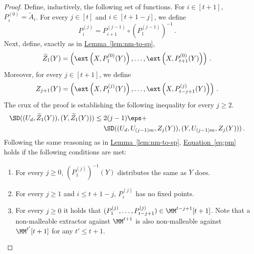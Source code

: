 \documentclass[11pt]{article}
\numberwithin{equation}{section}
\theoremstyle{definition}
\theoremstyle{plain}
\newcommand{\expref}[2]{\hyperref[#2]{#1~\ref{#2}}}
\newcommand{\expeqref}[2]{\hyperref[#2]{#1~\eqref{#2}}}
\begin{document}
\begin{proof}
Define, inductively, the following set of functions. 
For $i \in [t+1]$, $P_i^{(0)} = \widetilde{A}_i$. For every
$j \in [t]$ and $i \in [t+1-j]$, we define
\begin{equation}\label{eq:composing perm}
P_i^{(j)} = P_{i+1}^{(j-1)} \circ \left( P_{1}^{(j-1)} \right)^{-1}\,.
\end{equation}
Next, define, exactly as in \expref{Lemma}{lem:nm-to-sp},
\[
\widetilde{Z}_1(Y) = \left( \ext\left(X,P_{1}^{(0)}(Y)\right),\ldots, \ext\left(X,P_{t+1}^{(0)}(Y)\right) \right)\,.
\]
Moreover, for every $j \in [t+1]$, we define
\[
Z_{j+1}(Y) = \left( \ext\left(X,P_{1}^{(j)}(Y)\right),\ldots, \ext\left(X,P_{t-j+1}^{(j)}(Y)\right)\right)\,.
\]
The crux of the proof is establishing the following inequality for every $j \ge 2$.
\begin{align}\label{eq:pm}
\SD((U_d,\widetilde{Z}_1(Y)),(Y,\widetilde{Z}_1(Y))) &\le 2(j-1)\eps + \nonumber \\
& ~~~~\SD((U_{d},U_{(j-1)m},Z_j(Y)),(Y,U_{(j-1)m},Z_{j}(Y)))\,.
\end{align}
Following the same reasoning as in \expref{Lemma}{lem:nm-to-sp}, \expeqref{Equation}{eq:pm} holds if the 
following conditions are met:
\begin{enumerate}
\item\label{it:pm1}	For every $j \ge 0$, $\left(P_{1}^{(j)}\right)^{-1}(Y)$ distributes the same as $Y$ does.
\item\label{it:pm2}	For every $j \ge 1$ and $i \le t+1-j$, $P_{i}^{(j)}$ has no fixed points.
\item\label{it:pm3}	For every $j \ge 0$ it holds that $( P_{1}^{(j)},\ldots,P_{t-j+1}^{(j)} ) \in \MM^{t-j+1}[t+1]$.
Note that a non-malleable extractor against $\MM^{t+1}$
is also non-malleable against $\MM^{t'}[t+1]$ for any $t' \le t+1$. 
\end{enumerate}


\end{proof}
\end{document}
